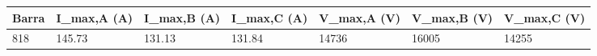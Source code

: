 \begin{tabular}{lllllll}
\toprule
Barra & I_{max,A} (A) & I_{max,B} (A) & I_{max,C} (A) & V_{max,A} (V) & V_{max,B} (V) & V_{max,C} (V) \\
\midrule
818 & 145.73 & 131.13 & 131.84 & 14736 & 16005 & 14255 \\
\bottomrule
\end{tabular}
